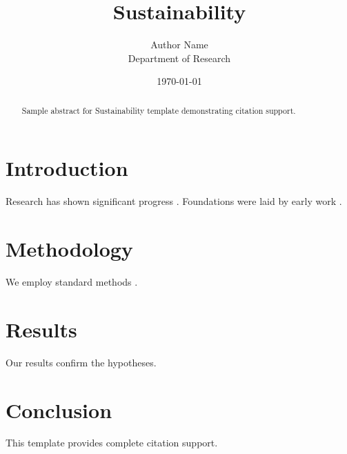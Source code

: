 \documentclass{mdpi}
\title{Sustainability}
\author{Author Name \\ \small Department of Research}
\date{\today}
\begin{document}
\maketitle

\begin{abstract}
Sample abstract for Sustainability template demonstrating citation support.
\end{abstract}

\section{Introduction}
Research has shown significant progress \citep{einstein1905}. Foundations were laid by early work \citep{turing1950}.

\section{Methodology}
We employ standard methods \citep{knuth1984}.

\section{Results}
Our results confirm the hypotheses.

\section{Conclusion}
This template provides complete citation support.



\end{document}
